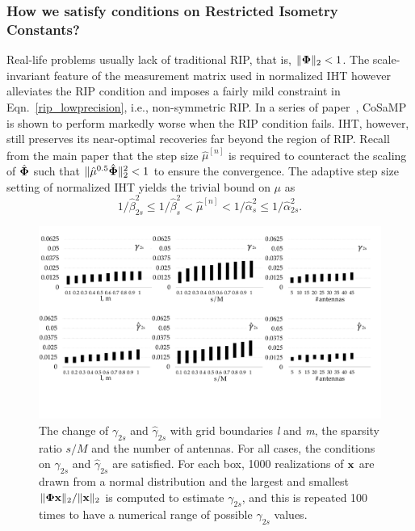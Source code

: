 \documentclass{article}
\begin{document}
\subsubsection{How we satisfy conditions on Restricted Isometry Constants?}
Real-life problems usually lack of traditional RIP, that is, $\|{\bf \Phi}\|_2 < 1$. The scale-invariant feature of the measurement matrix used in normalized IHT however alleviates the RIP condition and imposes a fairly mild constraint in Eqn.~\ref{rip_lowprecision}, i.e., non-symmetric RIP. In a series of paper~\cite{blumensath2010niht, blumensath2012greedy}, CoSaMP is shown to perform markedly worse when the RIP condition fails. IHT, however, still preserves its near-optimal recoveries far beyond the region of RIP. %
Recall from the main paper that the step size $\hat{\mu}^{[n]}$ is required to counteract the scaling of $\hat{{\bf \Phi}}$ such that $\|\hat{\mu}^{0.5} \hat{\bf\Phi}\|_2^2 <1$ to ensure the convergence. 
The adaptive step size setting of normalized IHT yields the trivial bound on $\mu$ as~\cite{blumensath2012greedy}
\begin{equation}
   1/\hat{\beta}_{2s}^2\leq  1/\hat{\beta}_s^2 < \hat{\mu}^{[n]} < 1/\hat{\alpha}_s^2 \leq 1/\hat{\alpha}_{2s}^2.
\end{equation}
\begin{figure}[t!]
\centering
\includegraphics[width=1\columnwidth, angle=0]{figs/gamma.pdf}
\caption{The change of $\gamma_{2s}$ and $\hat{\gamma}_{2s}$ with grid boundaries {\it l} and {\it m}, the sparsity ratio $s/M$ and the number of antennas. For all cases, the conditions on $\gamma_{2s}$ and $\hat{\gamma}_{2s}$ are satisfied. For each box, 1000 realizations of ${\bf x}$ are drawn from a normal distribution and the largest and smallest $\|{\bf \Phi x} \|_2/\| {\bf x}\|_2$ is computed to estimate $\gamma_{2s}$, and this is repeated 100 times to have a numerical range of possible ${\gamma}_{2s}$ values. }
\label{fig:gamma}
\end{figure}
\end{document}
